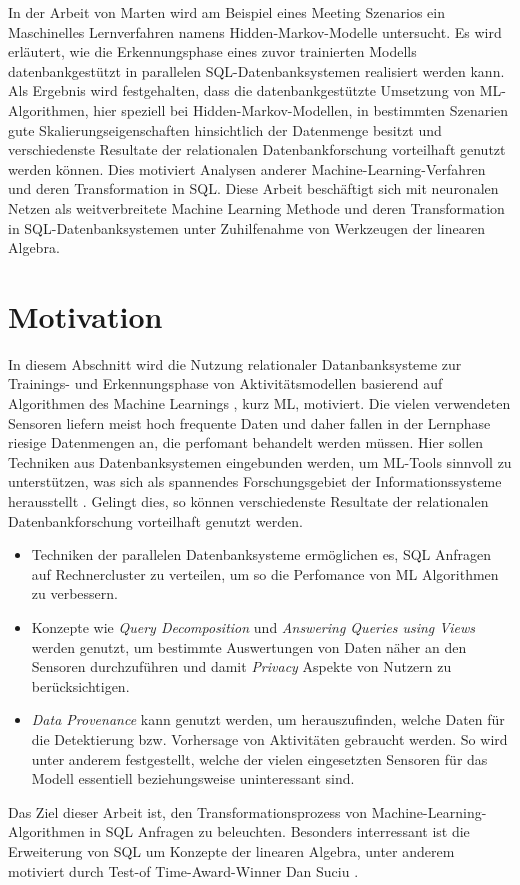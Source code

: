 In der Arbeit von Marten \cite{marten2017machine} wird am Beispiel eines Meeting Szenarios ein Maschinelles Lernverfahren namens Hidden-Markov-Modelle untersucht. Es wird erläutert, wie die Erkennungsphase eines zuvor trainierten Modells datenbankgestützt in parallelen SQL-Datenbanksystemen realisiert werden kann.   
Als Ergebnis wird festgehalten, dass die datenbankgestützte Umsetzung von ML-Algorithmen, hier speziell bei Hidden-Markov-Modellen, in bestimmten Szenarien gute Skalierungseigenschaften hinsichtlich der Datenmenge besitzt und verschiedenste Resultate der relationalen Datenbankforschung vorteilhaft genutzt werden können. Dies motiviert Analysen anderer Machine-Learning-Verfahren und deren Transformation in SQL. Diese Arbeit beschäftigt sich mit neuronalen Netzen als weitverbreitete Machine Learning Methode und deren Transformation in SQL-Datenbanksystemen unter Zuhilfenahme von Werkzeugen der linearen Algebra.

\section*{Motivation}

In diesem Abschnitt wird die Nutzung relationaler Datanbanksysteme zur Trainings- und Erkennungsphase von Aktivitätsmodellen 
basierend auf Algorithmen des Machine Learnings \cite{anzai2012pattern}, kurz ML, motiviert.
Die vielen verwendeten Sensoren liefern meist hoch frequente Daten und daher fallen in der Lernphase riesige Datenmengen an, die perfomant behandelt werden müssen.
Hier sollen Techniken aus Datenbanksystemen eingebunden werden, um ML-Tools sinnvoll zu unterstützen, was sich als spannendes Forschungsgebiet der Informationssysteme herausstellt \cite{abiteboul2018research}.
Gelingt dies, so können verschiedenste Resultate der relationalen Datenbankforschung vorteilhaft genutzt werden.
\begin{itemize}
    \item Techniken der parallelen Datenbanksysteme ermöglichen es, SQL Anfragen auf Rechnercluster zu verteilen, um so die Perfomance von ML Algorithmen zu verbessern.
    \item Konzepte wie \textit{Query Decomposition} \cite{chirkova2011materialized} und \textit{Answering Queries using Views} \cite{ afrati2019answering, levy1999answering} werden genutzt, um bestimmte Auswertungen von Daten näher an den Sensoren durchzuführen und damit \textit{Privacy} \cite{agrawal2000privacy} Aspekte von Nutzern zu berücksichtigen.
    \item \textit{Data Provenance} \cite{heuer2015metis, bruder2017konzepte} kann genutzt werden, um herauszufinden, welche Daten für die Detektierung bzw. Vorhersage von Aktivitäten gebraucht werden. 
    So wird unter anderem festgestellt, welche der vielen eingesetzten Sensoren für das Modell essentiell beziehungsweise uninteressant sind.
\end{itemize} 
Das Ziel dieser Arbeit ist, den Transformationsprozess von Machine-Learning-Algorithmen in SQL Anfragen zu beleuchten. Besonders interressant ist die Erweiterung von SQL um Konzepte der linearen Algebra, unter anderem motiviert durch Test-of Time-Award-Winner Dan Suciu \cite{interviewsuciu} .


